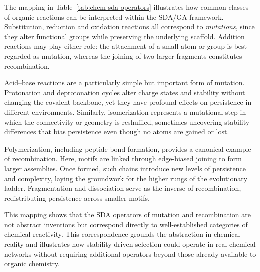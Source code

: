 \documentclass[life,article,submit,pdftex,moreauthors]{Definitions/mdpi}
\begin{document}
The mapping in Table~\ref{tab:chem-sda-operators} illustrates how common classes of organic reactions can be interpreted within the SDA/GA framework. Substitution, reduction and oxidation reactions all correspond to \textit{mutations}, since they alter functional groups while preserving the underlying scaffold. Addition reactions may play either role: the attachment of a small atom or group is best regarded as mutation, whereas the joining of two larger fragments constitutes recombination.  

Acid--base reactions are a particularly simple but important form of mutation. Protonation and deprotonation cycles alter charge states and stability without changing the covalent backbone, yet they have profound effects on persistence in different environments. Similarly, isomerization represents a mutational step in which the connectivity or geometry is reshuffled, sometimes uncovering stability differences that bias persistence even though no atoms are gained or lost.  

Polymerization, including peptide bond formation, provides a canonical example of recombination. Here, motifs are linked through edge-biased joining to form larger assemblies. Once formed, such chains introduce new levels of persistence and complexity, laying the groundwork for the higher rungs of the evolutionary ladder. Fragmentation and dissociation serve as the inverse of recombination, redistributing persistence across smaller motifs.  

This mapping shows that the SDA operators of mutation and recombination are not abstract inventions but correspond directly to well-established categories of chemical reactivity. This correspondence grounds the abstraction in chemical reality and illustrates how stability-driven selection could operate in real chemical networks without requiring additional operators beyond those already available to organic chemistry.
\end{document}
